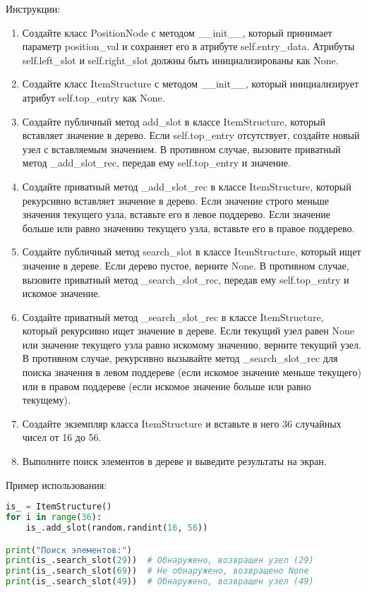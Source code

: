 \begin{enumerate}
Инструкции:
\begin{enumerate}
    \item Создайте класс PositionNode с методом \_\_init\_\_, который принимает параметр position\_val и сохраняет его в атрибуте self.entry\_data. Атрибуты self.left\_slot и self.right\_slot должны быть инициализированы как None.
    \item Создайте класс ItemStructure с методом \_\_init\_\_, который инициализирует атрибут self.top\_entry как None.
    \item Создайте публичный метод add\_slot в классе ItemStructure, который вставляет значение в дерево. Если self.top\_entry отсутствует, создайте новый узел с вставляемым значением. В противном случае, вызовите приватный метод \_add\_slot\_rec, передав ему self.top\_entry и значение.
    \item Создайте приватный метод \_add\_slot\_rec в классе ItemStructure, который рекурсивно вставляет значение в дерево. Если значение строго меньше значения текущего узла, вставьте его в левое поддерево. Если значение больше или равно значению текущего узла, вставьте его в правое поддерево.
    \item Создайте публичный метод search\_slot в классе ItemStructure, который ищет значение в дереве. Если дерево пустое, верните None. В противном случае, вызовите приватный метод \_search\_slot\_rec, передав ему self.top\_entry и искомое значение.
    \item Создайте приватный метод \_search\_slot\_rec в классе ItemStructure, который рекурсивно ищет значение в дереве. Если текущий узел равен None или значение текущего узла равно искомому значению, верните текущий узел. В противном случае, рекурсивно вызывайте метод \_search\_slot\_rec для поиска значения в левом поддереве (если искомое значение меньше текущего) или в правом поддереве (если искомое значение больше или равно текущему).
    \item Создайте экземпляр класса ItemStructure и вставьте в него 36 случайных чисел от 16 до 56.
    \item Выполните поиск элементов в дереве и выведите результаты на экран.
\end{enumerate}

Пример использования:
\begin{lstlisting}[language=Python]
is_ = ItemStructure()
for i in range(36):
    is_.add_slot(random.randint(16, 56))

print("Поиск элементов:")
print(is_.search_slot(29))  # Обнаружено, возвращен узел (29)
print(is_.search_slot(69))  # Не обнаружено, возвращено None
print(is_.search_slot(49))  # Обнаружено, возвращен узел (49)
\end{lstlisting}


\end{enumerate}
